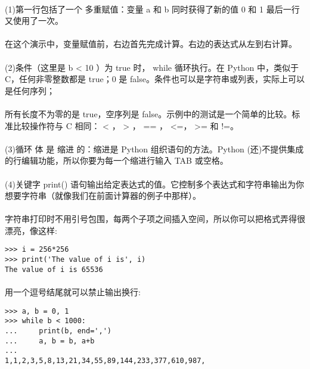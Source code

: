 \documentclass{article}
\begin{document}
\begin{CJK}{UTF8}{gbsn}
\paragraph{}
(1)第一行包括了一个 多重赋值：变量 a 和 b 同时获得了新的值 0 和 1 最后一行又使用了一次。
\paragraph{}
在这个演示中，变量赋值前，右边首先完成计算。右边的表达式从左到右计算。
\paragraph{}
(2)条件（这里是 b < 10 ）为 true 时， while 循环执行。在 Python 中，类似于 C，任何非零整数都是 true；0 是 false。条件也可以是字符串或列表，实际上可以是任何序列；
\paragraph{}
所有长度不为零的是 true，空序列是 false。示例中的测试是一个简单的比较。标准比较操作符与 C 相同： < ， > ， == ， <=， >= 和 !=。
\paragraph{}
(3)循环 体 是 缩进 的：缩进是 Python 组织语句的方法。Python (还)不提供集成的行编辑功能，所以你要为每一个缩进行输入 TAB 或空格。
\paragraph{}
(4)关键字 print() 语句输出给定表达式的值。它控制多个表达式和字符串输出为你想要字符串（就像我们在前面计算器的例子中那样）。
\paragraph{}
字符串打印时不用引号包围，每两个子项之间插入空间，所以你可以把格式弄得很漂亮，像这样:
\begin{verbatim}
>>> i = 256*256
>>> print('The value of i is', i)
The value of i is 65536
\end{verbatim}
\paragraph{}
用一个逗号结尾就可以禁止输出换行:
\begin{verbatim}
>>> a, b = 0, 1
>>> while b < 1000:
...     print(b, end=',')
...     a, b = b, a+b
...
1,1,2,3,5,8,13,21,34,55,89,144,233,377,610,987,
\end{verbatim}

\end{CJK}
\end{document}
